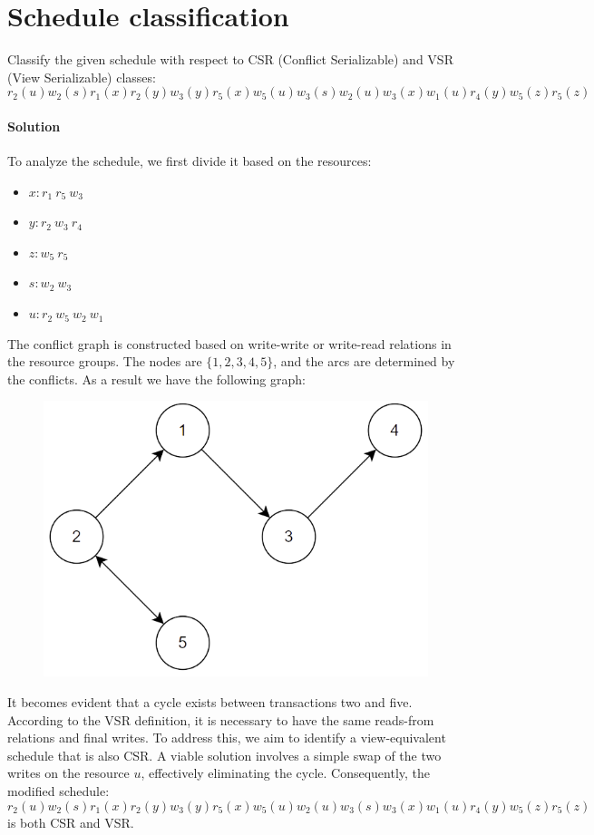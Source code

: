 \section{Schedule classification}

Classify the given schedule with respect to CSR (Conflict Serializable) and VSR (View Serializable) classes:
\[r_2(u) w_2(s) r_1(x) r_2(y) w_3(y) r_5(x) w_5(u) w_3(s)w_2(u) w_3(x) w_1(u) r_4(y) w_5(z) r_5(z)\]

\paragraph*{Solution}
To analyze the schedule, we first divide it based on the resources:
\begin{itemize}
    \item $x: r_1 \: r_5 \:w_3$
    \item $y: r_2 \: w_3 \:r_4$
    \item $z: w_5 \: r_5$
    \item $s: w_2 \: w_3$
    \item $u: r_2 \: w_5 \: w_2 \:w_1$
\end{itemize}
The conflict graph is constructed based on write-write or write-read relations in the resource groups. 
The nodes are $\{1,2,3,4,5\}$, and the arcs are determined by the conflicts. 
As a result we have the following graph:
\begin{figure}[H]
    \centering
    \includegraphics[width=0.5\linewidth]{images/conflictgraph1.png}
\end{figure}
It becomes evident that a cycle exists between transactions two and five. 
According to the VSR definition, it is necessary to have the same reads-from relations and final writes.
To address this, we aim to identify a view-equivalent schedule that is also CSR. 
A viable solution involves a simple swap of the two writes on the resource $u$, effectively eliminating the cycle. 
Consequently, the modified schedule:
\[r_2(u) w_2(s) r_1(x) r_2(y) w_3(y) r_5(x) w_5(u) w_2(u) w_3(s) w_3(x) w_1(u) r_4(y) w_5(z) r_5(z)\]
is both CSR and VSR.